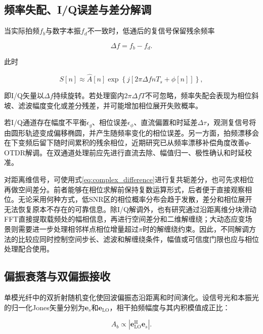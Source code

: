\subsection{频率失配、I/Q误差与差分解调}

当实际拍频$f_b$与数字本振$f_d$不一致时，低通后的复信号保留残余频率

\begin{equation}
\Delta f=f_b-f_d.
\label{eq:frequency_mismatch}
\end{equation}

此时

\begin{equation}
S[n]
\approx
\hat A[n]\exp\!\left\{
j\left[
2\pi\Delta f nT_s+\phi[n]
\right]
\right\},
\label{eq:residual_rotation}
\end{equation}

即I/Q矢量以$\Delta f$持续旋转。若处理窗内$2\pi\Delta f T$不可忽略，频率失配会表现为相位斜坡、滤波幅度变化或差分残差，并可能增加相位展开失败概率\cite{zhong2021frequency,qian2025drift}。

若I/Q通道存在幅度不平衡$\epsilon_g$、相位误差$\epsilon_\phi$、直流偏置和时延差$\Delta\tau$，观测复信号将由圆形轨迹变成偏移椭圆，并产生随频率变化的相位误差。另一方面，拍频漂移会在下变频后留下随时间累积的残余相位，近期研究已从频率漂移补偿角度改善φ-OTDR解调\cite{zhao2024frequency}。在双通道处理前应先进行直流去除、幅值归一、极性确认和时延校准。

对距离维信号，可使用式\eqref{eq:complex_difference}进行复共轭差分，也可先求相位再做空间差分。前者能够在相位求解前保持复数运算形式，后者便于直接观察相位。无论采用何种方式，低SNR区的相位概率分布会趋于发散，差分和相位展开无法恢复原本不存在的可靠信息\cite{lu2021detection,lu2022phaseerror,lu2023phase}。除I/Q解调外，也有研究通过沿距离维分块滑动FFT直接提取载频处的幅相信息，再进行空间差分和二维解缠绕\cite{si2023fft_cn}；大动态应变场景则需要进一步处理相邻样点相位增量超过$\pi$时的解缠绕约束\cite{ran2025dynamic_thesis}。因此，不同解调方法的比较应同时控制空间步长、滤波和解缠绕条件，幅值或可信度门限也应与相位处理配合使用。

\subsection{偏振衰落与双偏振接收}

单模光纤中的双折射随机变化使回波偏振态沿距离和时间演化。设信号光和本振光的归一化Jones矢量分别为$\mathbf e_s$和$\mathbf e_{\mathrm{LO}}$，相干拍频幅度与其内积模值成正比：

\begin{equation}
A_b
\propto
\left|
\mathbf e_{\mathrm{LO}}^{\mathrm H}\mathbf e_s
\right|.
\label{eq:polarization_inner}
\end{equation}


